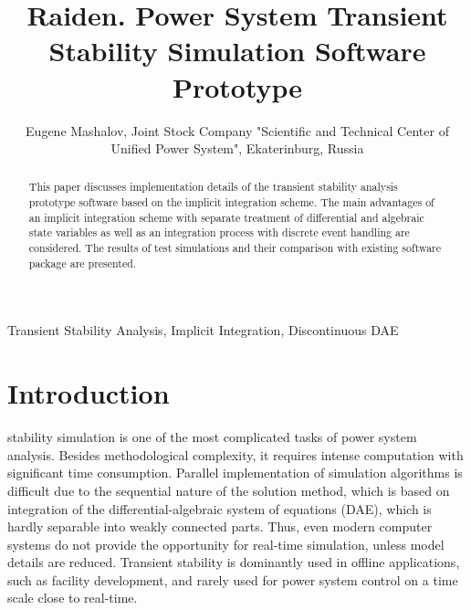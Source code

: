 \documentclass[lettersize,journal]{IEEEtran}
\begin{document}
\title{Raiden. Power System Transient Stability Simulation Software Prototype}

\author {Eugene Mashalov, Joint Stock Company "Scientific and Technical Center of Unified Power System", Ekaterinburg, Russia}




\maketitle

\begin{abstract}
This paper discusses implementation details of the transient stability analysis prototype software based on the implicit integration scheme. The main advantages of an implicit integration scheme with separate treatment of differential and algebraic state variables as well as an integration process with discrete event handling are considered. The results of test simulations and their comparison with existing software package are presented.
\end{abstract}

\begin{IEEEkeywords}
Transient Stability Analysis, Implicit Integration, Discontinuous DAE
\end{IEEEkeywords}

\section{Introduction}
 stability simulation is one of the most complicated tasks of power system analysis. Besides methodological complexity, it requires intense computation with significant time consumption. Parallel implementation of simulation algorithms is difficult due to the sequential nature of the solution method, which is based on integration of the differential-algebraic system of equations (DAE), which is hardly separable into weakly connected parts. Thus, even modern computer systems do not provide the opportunity for real-time simulation, unless model details are reduced. Transient stability is dominantly used in offline applications, such as facility development, and rarely used for power system control on a time scale close to real-time.
\end{document}
